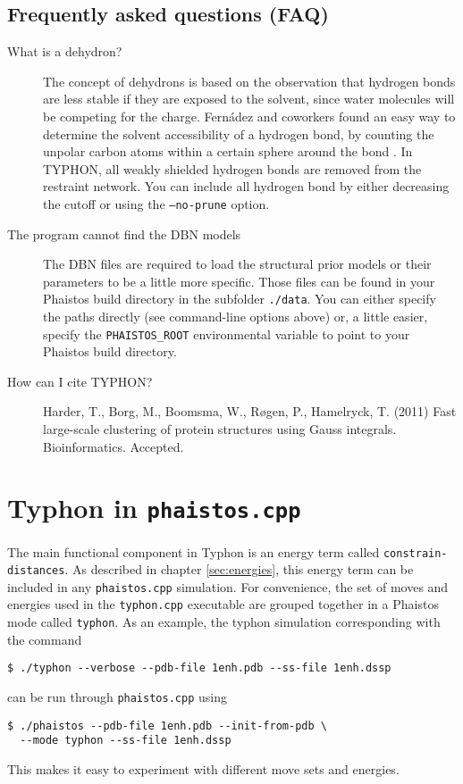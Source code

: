\subsection{Frequently asked questions (FAQ)}
\label{sec:faq-typhon}


\begin{description}

\item[What is a dehydron?] The concept of dehydrons is based on the
  observation that hydrogen bonds are less stable if they are exposed
  to the solvent, since water molecules will be competing for the
  charge.  Fern{\'a}dez and coworkers found an easy way to determine the
  solvent accessibility of a hydrogen bond, by counting the unpolar
  carbon atoms within a certain sphere around the bond \cite{fernandez2003dehydron}. In TYPHON, all
  weakly shielded hydrogen bonds are removed from the restraint
  network.  You can include all hydrogen bond by either decreasing the
  cutoff or using the \texttt{--no-prune} option.

\item[The program cannot find the DBN models] The DBN files are
  required to load the structural prior models or their parameters to
  be a little more specific. Those files can be found in your Phaistos
  build directory in the subfolder \texttt{./data}. You can either
  specify the paths directly (see command-line options above) or, a
  little easier, specify the \texttt{PHAISTOS\_ROOT} environmental
  variable to point to your Phaistos build directory.

\item[How can I cite TYPHON?] Harder, T., Borg, M., Boomsma, W.,
  R{\o}gen, P., Hamelryck, T. (2011) Fast large-scale clustering of
  protein structures using Gauss integrals. Bioinformatics. Accepted.

\end{description}


\section{Typhon in \texttt{phaistos.cpp}}
\label{sec:typhon-in-phaistos}

The main functional component in Typhon is an energy term called
\texttt{con\-strain-dis\-tan\-ces}. As described in chapter
\ref{sec:energies}, this energy term can be included in any
\texttt{phaistos.cpp} simulation. For convenience, the set of moves
and energies used in the \texttt{typhon.cpp} executable are grouped
together in a Phaistos mode called \texttt{typhon}. As an example, the
typhon simulation corresponding with the command

\begin{verbatim}
$ ./typhon --verbose --pdb-file 1enh.pdb --ss-file 1enh.dssp
\end{verbatim}

\noindent can be run through \texttt{phaistos.cpp} using

\begin{verbatim}
$ ./phaistos --pdb-file 1enh.pdb --init-from-pdb \
  --mode typhon --ss-file 1enh.dssp
\end{verbatim}

\noindent This makes it easy to experiment with different move sets
and energies.
